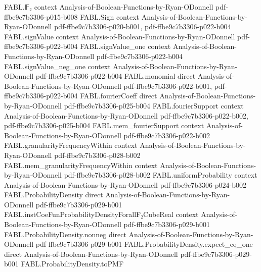 \begin{theorem}
\label{FABL.convolution_apply_swap_add}
\leanok
{}
\proofstep
  {FABL.𝔽₂}
  {context}
  {Analysis-of-Boolean-Functions-by-Ryan-ODonnell}
  {pdf-ffbe9c7b3306-p015-b008}
\proofstep
  {FABL.Sign}
  {context}
  {Analysis-of-Boolean-Functions-by-Ryan-ODonnell}
  {pdf-ffbe9c7b3306-p020-b001,
    pdf-ffbe9c7b3306-p022-b004}
\proofstep
  {FABL.signValue}
  {context}
  {Analysis-of-Boolean-Functions-by-Ryan-ODonnell}
  {pdf-ffbe9c7b3306-p022-b004}
\proofstep
  {FABL.signValue_one}
  {context}
  {Analysis-of-Boolean-Functions-by-Ryan-ODonnell}
  {pdf-ffbe9c7b3306-p022-b004}
\proofstep
  {FABL.signValue_neg_one}
  {context}
  {Analysis-of-Boolean-Functions-by-Ryan-ODonnell}
  {pdf-ffbe9c7b3306-p022-b004}
\proofstep
  {FABL.monomial}
  {direct}
  {Analysis-of-Boolean-Functions-by-Ryan-ODonnell}
  {pdf-ffbe9c7b3306-p022-b001,
    pdf-ffbe9c7b3306-p022-b004}
\proofstep
  {FABL.fourierCoeff}
  {direct}
  {Analysis-of-Boolean-Functions-by-Ryan-ODonnell}
  {pdf-ffbe9c7b3306-p025-b004}
\proofstep
  {FABL.fourierSupport}
  {context}
  {Analysis-of-Boolean-Functions-by-Ryan-ODonnell}
  {pdf-ffbe9c7b3306-p022-b002,
    pdf-ffbe9c7b3306-p025-b004}
\proofstep
  {FABL.mem_fourierSupport}
  {context}
  {Analysis-of-Boolean-Functions-by-Ryan-ODonnell}
  {pdf-ffbe9c7b3306-p022-b002}
\proofstep
  {FABL.granularityFrequencyWithin}
  {context}
  {Analysis-of-Boolean-Functions-by-Ryan-ODonnell}
  {pdf-ffbe9c7b3306-p028-b002}
\proofstep
  {FABL.mem_granularityFrequencyWithin}
  {context}
  {Analysis-of-Boolean-Functions-by-Ryan-ODonnell}
  {pdf-ffbe9c7b3306-p028-b002}
\proofstep
  {FABL.uniformProbability}
  {context}
  {Analysis-of-Boolean-Functions-by-Ryan-ODonnell}
  {pdf-ffbe9c7b3306-p024-b002}
\proofstep
  {FABL.ProbabilityDensity}
  {direct}
  {Analysis-of-Boolean-Functions-by-Ryan-ODonnell}
  {pdf-ffbe9c7b3306-p029-b001}
\proofstep
  {FABL.instCoeFunProbabilityDensityForallF₂CubeReal}
  {context}
  {Analysis-of-Boolean-Functions-by-Ryan-ODonnell}
  {pdf-ffbe9c7b3306-p029-b001}
\proofstep
  {FABL.ProbabilityDensity.nonneg}
  {direct}
  {Analysis-of-Boolean-Functions-by-Ryan-ODonnell}
  {pdf-ffbe9c7b3306-p029-b001}
\proofstep
  {FABL.ProbabilityDensity.expect_eq_one}
  {direct}
  {Analysis-of-Boolean-Functions-by-Ryan-ODonnell}
  {pdf-ffbe9c7b3306-p029-b001}
\proofstep
  {FABL.ProbabilityDensity.toPMF}

\end{theorem}

